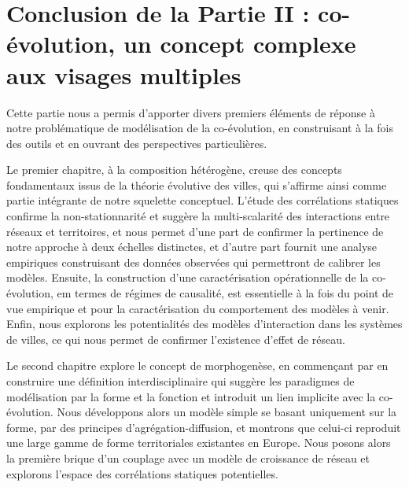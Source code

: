 



\chapter*{Conclusion de la Partie II : co-évolution, un concept complexe aux visages multiples}








Cette partie nous a permis d'apporter divers premiers éléments de réponse à notre problématique de modélisation de la co-évolution, en construisant à la fois des outils et en ouvrant des perspectives particulières. 


Le premier chapitre, à la composition hétérogène, creuse des concepts fondamentaux issus de la théorie évolutive des villes, qui s'affirme ainsi comme partie intégrante de notre squelette conceptuel. L'étude des corrélations statiques confirme la non-stationnarité et suggère la multi-scalarité des interactions entre réseaux et territoires, et nous permet d'une part de confirmer la pertinence de notre approche à deux échelles distinctes, et d'autre part fournit une analyse empiriques construisant des données observées qui permettront de calibrer les modèles. Ensuite, la construction d'une caractérisation opérationnelle de la co-évolution, em termes de régimes de causalité, est essentielle à la fois du point de vue empirique et pour la caractérisation du comportement des modèles à venir. Enfin, nous explorons les potentialités des modèles d'interaction dans les systèmes de villes, ce qui nous permet de confirmer l'existence d'effet de réseau.

Le second chapitre explore le concept de morphogenèse, en commençant par en construire une définition interdisciplinaire qui suggère les paradigmes de modélisation par la forme et la fonction et introduit un lien implicite avec la co-évolution. Nous développons alors un modèle simple se basant uniquement sur la forme, par des principes d'agrégation-diffusion, et montrons que celui-ci reproduit une large gamme de forme territoriales existantes en Europe. Nous posons alors la première brique d'un couplage avec un modèle de croissance de réseau et explorons l'espace des corrélations statiques potentielles.


